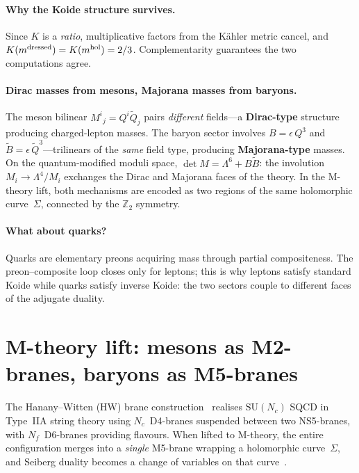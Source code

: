\documentclass[12pt,a4paper]{article}
\newcommand{\SU}{\mathrm{SU}}
\newcommand{\Nf}{N_f}
\begin{document}
\paragraph{Why the Koide structure survives.}
Since $K$ is a \emph{ratio}, multiplicative factors from the
K\"ahler metric cancel, and $K(m^{\rm dressed}) = K(m^{\rm hol})
= 2/3$.  Complementarity guarantees the two computations agree.

\paragraph{Dirac masses from mesons, Majorana masses from baryons.}
The meson bilinear $M^i{}_j = Q^i\tilde{Q}_j$
pairs \emph{different} fields---a
\textbf{Dirac-type} structure producing charged-lepton masses.
The baryon sector involves $B = \epsilon\,Q^3$ and
$\tilde{B} = \epsilon\,\tilde{Q}^3$---trilinears of the
\emph{same} field type, producing \textbf{Majorana-type} masses.
On the quantum-modified moduli space, $\det M = \Lambda^6
+ B\tilde{B}$: the involution $M_i \to \Lambda^4/M_i$
exchanges the Dirac and Majorana faces of the theory.
In the M-theory lift, both
mechanisms are encoded as two regions of the same holomorphic
curve~$\Sigma$, connected by the $\mathbb{Z}_2$ symmetry.

\paragraph{What about quarks?}
Quarks are elementary preons acquiring mass through partial
compositeness. The preon--composite loop closes only for leptons;
this is why leptons satisfy standard Koide while quarks satisfy
inverse Koide: the two sectors couple to different faces of
the adjugate duality.


\section{M-theory lift: mesons as M2-branes, baryons as M5-branes}
\label{app:Mtheory}

The Hanany--Witten (HW) brane construction~\cite{HananyWitten:1997}
realises $\SU(N_c)$ SQCD in Type~IIA string theory using
$N_c$~D4-branes suspended between two NS5-branes, with
$\Nf$~D6-branes providing flavours.  When lifted to M-theory,
the entire configuration merges into a \emph{single} M5-brane wrapping a
holomorphic curve~$\Sigma$, and Seiberg duality becomes a change of
variables on that curve~\cite{Witten:1997M5}.
\end{document}
